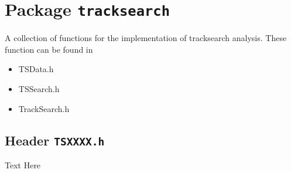 \chapter{Package \texttt{tracksearch}}

A collection of functions for the implementation of tracksearch
analysis. These function can be found in
\begin{itemize}
\item TSData.h
\item TSSearch.h
\item TrackSearch.h
\end{itemize}

\newpage

\newpage

\section{Header \texttt{TSXXXX.h}}
\label{s:TSXXXX.h}

Text Here


